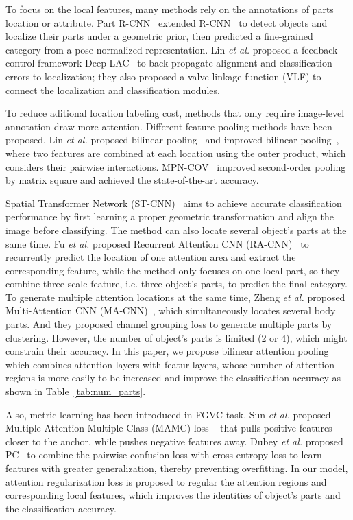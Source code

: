 \documentclass[10pt,twocolumn,letterpaper]{article}
\def\etal{{\em et al. }}
\begin{document}
To focus on the local features, many methods rely on the annotations of parts location or attribute. Part R-CNN~\cite{Part-rcnn}  extended R-CNN~\cite{rcnn} to detect objects and localize their parts under a geometric prior, then predicted a fine-grained category from a pose-normalized representation.  Lin \etal proposed a feedback-control framework Deep LAC~\cite{deeplac} to back-propagate alignment and classification errors to localization; they also proposed a valve linkage function (VLF) to connect the localization and classification modules.

To reduce aditional location labeling cost, methods that only require image-level annotation draw more attention. Different feature pooling methods have been proposed. Lin \etal proposed bilinear pooling~\cite{bcnn} and improved bilinear pooling~\cite{improved_bcnn}, where two features are combined at each location using the outer product, which considers their pairwise interactions. MPN-COV~\cite{mpn-cov} improved second-order pooling by matrix square and achieved the state-of-the-art accuracy.

Spatial Transformer Network (ST-CNN)~\cite{stn} aims to achieve accurate classification performance by first learning a proper geometric transformation and align the image before classifying. The method can also locate several object's parts at the same time. Fu \etal proposed Recurrent Attention CNN (RA-CNN)~\cite{ra-cnn} to recurrently predict the location of one attention area and extract the corresponding feature, while the method only focuses on one local part, so they combine three scale feature, i.e. three object's parts, to predict the final category.
To generate multiple attention locations at the same time, Zheng \etal proposed Multi-Attention CNN (MA-CNN)~\cite{ma-cnn}, which simultaneously locates several body parts. And they proposed channel grouping loss to generate multiple parts by clustering. However, the number of object's parts is limited (2 or 4), which might constrain their accuracy. In this paper, we propose bilinear attention pooling which combines attention layers with featur layers, whose number of attention regions is more easily to be increased and improve the classification accuracy as shown in Table~\ref{tab:num_parts}.

Also, metric learning has been introduced in FGVC task. Sun \etal proposed Multiple Attention Multiple Class (MAMC) loss ~\cite{mamc} that pulls positive features closer to the anchor, while pushes negative features away. Dubey \etal proposed PC~\cite{pairwise_confusion} to combine the pairwise confusion loss with cross entropy loss to learn features with greater generalization, thereby preventing overfitting. In our model, attention regularization loss is proposed to regular the attention regions and corresponding local features, which improves the identities of object's parts and the classification accuracy.
\end{document}
